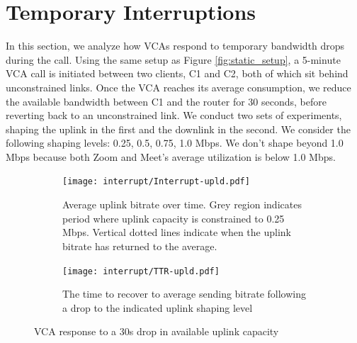 

\section{Temporary Interruptions}
\label{sec:interruption}
In this section, we analyze how VCAs respond to temporary bandwidth drops during the call. Using the same setup as Figure \ref{fig:static_setup}, a 5-minute VCA call is initiated between two clients, C1 and C2, both of which sit behind unconstrained links. Once the VCA reaches its average consumption, we reduce the available bandwidth between C1 and the router for 30 seconds, before reverting back to an unconstrained link. We conduct two sets of experiments, shaping the uplink in the first and the downlink in the second. We consider the following shaping levels: {0.25, 0.5, 0.75, 1.0} Mbps. We don't shape beyond 1.0 Mbps because both Zoom and Meet's average utilization is below 1.0 Mbps.

\begin{figure}[t!]
\centering
\begin{subfigure}[t]{.45\textwidth}
    \centering
    \texttt{[image: interrupt/Interrupt-upld.pdf]}
    \caption{Average uplink bitrate over time. Grey region indicates period where uplink capacity is constrained to 0.25 Mbps. Vertical dotted lines indicate when the uplink bitrate has returned to the average.}
    \label{fig:ts_upld}
\end{subfigure}\hfill
\begin{subfigure}[t]{.45\textwidth}
      \centering
    \texttt{[image: interrupt/TTR-upld.pdf]}
    \caption{The time to recover to average sending bitrate following a drop to the indicated uplink shaping level}
    \label{fig:TTR_upld}
\end{subfigure}
\caption{VCA response to a 30s drop in available uplink capacity}
\label{fig:interrupt-upld}
\end{figure}

